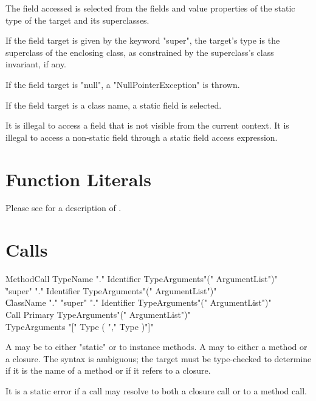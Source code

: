 The field accessed is selected from the fields and value properties
of the static type of the target and its superclasses.

If the field target is given by the keyword \xcd"super",
the target's type is
the superclass of the enclosing class, as
constrained by the superclass's class invariant, if any.

If the field target is \xcd"null", a \xcd"NullPointerException"
is thrown.

If the field target is a class name, a static field is selected.

It is illegal to access  a field that is not visible from
the current context.
It is illegal to access a non-static field
through a static field access expression.

\section{Function Literals}
Please see  for a description of .

\section{Calls}
\label{Call}
\label{MethodInvocation}
\label{MethodInvocationSubstitution}

\begin{grammar}
MethodCall \: TypeName \xcd"." Identifier TypeArguments\opt \xcd"(" ArgumentList\opt \xcd")" \\
           \| \xcd"super" \xcd"." Identifier TypeArguments\opt \xcd"(" ArgumentList\opt \xcd")" \\
           \| ClassName \xcd"." \xcd"super" \xcd"." Identifier TypeArguments\opt \xcd"(" ArgumentList\opt \xcd")" \\
Call \: Primary TypeArguments\opt \xcd"(" ArgumentList\opt \xcd")" \\
TypeArguments \: \xcd"[" Type ( \xcd"," Type )\star \xcd"]" \\
\end{grammar}

A  may be to either \xcd"static" or to
instance methods.  A  may to either a method
or a closure.  The syntax is ambiguous; the target must be
type-checked to determine if it is the name of a method or if it
refers to a closure.

It is a static error if a call may resolve to both a closure
call or to a method call.  

